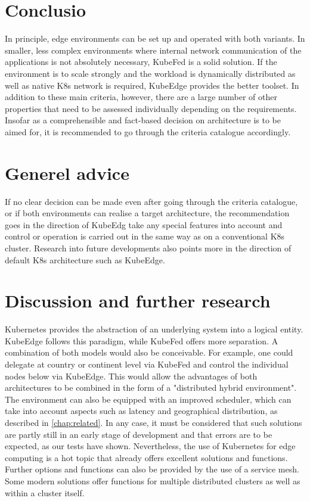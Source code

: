 \documentclass[MSC,Master,english]{twbook}%
\begin{document}
\section{Conclusio}
\label{sec:conclusio}
In principle, edge environments can be set up and operated with both variants. In smaller, less complex environments where internal network communication of the applications is not absolutely necessary, KubeFed is a solid solution. If the environment is to scale strongly and the workload is dynamically distributed as well as native \ac{K8s} network is required, KubeEdge provides the better toolset. In addition to these main criteria, however, there are a large number of other properties that need to be assessed individually depending on the requirements. Insofar as a comprehensible and fact-based decision on architecture is to be aimed for, it is recommended to go through the criteria catalogue accordingly.

\section{Generel advice}
If no clear decision can be made even after going through the criteria catalogue, or if both environments can realise a target architecture, the recommendation goes in the direction of KubeEdg  take any special features into account and control or operation is carried out in the same way as on a conventional \ac{K8s} cluster. Research into future developments also points more in the direction of default K8s architecture such as KubeEdge.

\section{Discussion and further research}
\label{sec:discuss}
Kubernetes provides the abstraction of an underlying system into a logical entity. KubeEdge follows this paradigm, while KubeFed offers more separation. A combination of both models would also be conceivable. For example, one could delegate at country or continent level via KubeFed and control the individual nodes below via KubeEdge. This would allow the advantages of both architectures to be combined in the form of a "distributed hybrid environment". The environment can also be equipped with an improved scheduler, which can take into account aspects such as latency and geographical distribution, as described in \autoref{chap:related}. In any case, it must be considered that such solutions are partly still in an early stage of development and that errors are to be expected, as our tests have shown. Nevertheless, the use of Kubernetes for edge computing is a hot topic that already offers excellent solutions and functions. Further options and functions can also be provided by the use of a service mesh. Some modern solutions offer functions for multiple distributed clusters as well as within a cluster itself.
\end{document}
